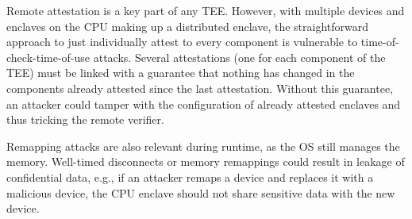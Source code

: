 Remote attestation is a key part of any TEE. However, with multiple \sphw devices and enclaves on the CPU making up a distributed enclave, the straightforward approach to just individually attest to every component is vulnerable to time-of-check-time-of-use attacks. Several attestations (one for each component of the TEE) must be linked with a guarantee that nothing has changed in the components already attested since the last attestation. Without this guarantee, an attacker could tamper with the configuration of already attested enclaves and thus tricking the remote verifier.

Remapping attacks are also relevant during runtime, as the OS still manages the memory. Well-timed disconnects or memory remappings could result in leakage of confidential data, e.g., if an attacker remaps a \sphw device and replaces it with a malicious device, the CPU enclave should not share sensitive data with the new device. 

